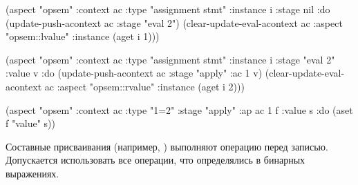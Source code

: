 \documentclass[12pt,twoside,russian]{article}
\newcommand{\GoInline}[1]{\goinline{#1}}
\begin{document}
\begin{ABMLCode}
(aspect "opsem" :context ac :type "assignment stmt" :instance i 
  :stage nil :do 
  (update-push-acontext ac :stage "eval 2")
  (clear-update-eval-acontext ac :aspect "opsem::lvalue" 
                                 :instance (aget i 1)))

(aspect "opsem" :context ac :type "assignment stmt" :instance i 
  :stage "eval 2" :value v :do 
  (update-push-acontext ac :stage "apply" :ac 1 v)
  (clear-update-eval-acontext ac :aspect "opsem::rvalue" 
                                 :instance (aget i 2)))

(aspect "opsem" :context ac :type "1=2" :stage "apply" :ap ac 1 f 
  :value s :do (aset f "value" s))
\end{ABMLCode}


Составные присваивания (например, \GoInline{+=}) выполняют операцию перед записью. Допускается использовать все операции, что определялись в бинарных выражениях.
\end{document}
